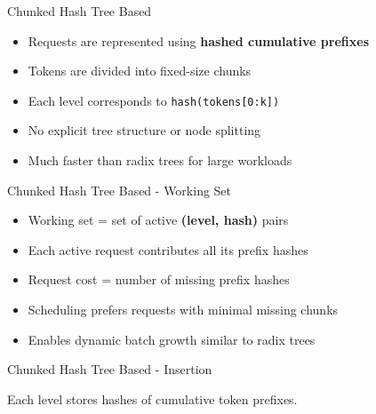 \documentclass[Serif, 10pt, brown]{beamer}
\theoremstyle{example}
\theoremstyle{plain}
\begin{document}
\begin{frame}{Chunked Hash Tree Based}
\begin{itemize}
    \item Requests are represented using \textbf{hashed cumulative prefixes}
    \item Tokens are divided into fixed-size chunks
    \item Each level corresponds to \texttt{hash(tokens[0:k])}
    \item No explicit tree structure or node splitting
    \item Much faster than radix trees for large workloads
\end{itemize}
\end{frame}

\begin{frame}{Chunked Hash Tree Based - Working Set}
\begin{itemize}
    \item Working set = set of active \textbf{(level, hash)} pairs
    \item Each active request contributes all its prefix hashes
    \item Request cost = number of missing prefix hashes
    \item Scheduling prefers requests with minimal missing chunks
    \item Enables dynamic batch growth similar to radix trees
\end{itemize}
\end{frame}


\begin{frame}{Chunked Hash Tree Based - Insertion}
\centering
{}

\vspace{0.5em}
\small
Each level stores hashes of cumulative token prefixes.
\end{frame}
\end{document}
